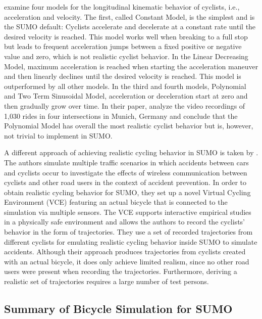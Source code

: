 \textcite{twaddle2016modeling} examine four models for the longitudinal kinematic behavior of cyclists, i.e., acceleration and velocity.
The first, called Constant Model, is the simplest and is the SUMO default:
Cyclists accelerate and decelerate at a constant rate until the desired velocity is reached.
This model works well when breaking to a full stop but leads to frequent acceleration jumps between a fixed positive or negative value and zero, which is not realistic cyclist behavior.
In the Linear Decreasing Model, maximum acceleration is reached when starting the acceleration maneuver and then linearly declines until the desired velocity is reached.
This model is outperformed by all other models.
In the third and fourth models, Polynomial and Two Term Sinusoidal Model, acceleration or deceleration start at zero and then gradually grow over time.
In their paper, \textcite{twaddle2016modeling} analyze the video recordings of 1,030 rides in four intersections in Munich, Germany and conclude that the Polynomial Model has overall the most realistic cyclist behavior but is, however, not trivial to implement in SUMO.

A different approach of achieving realistic cycling behavior in SUMO is taken by \textcite{heinovski2019modeling}.
The authors simulate multiple traffic scenarios in which accidents between cars and cyclists occur to investigate the effects of wireless communication between cyclists and other road users in the context of accident prevention.
In order to obtain realistic cycling behavior for SUMO, they set up a novel Virtual Cycling Environment (VCE) featuring an actual bicycle that is connected to the simulation via multiple sensors.
The VCE supports interactive empirical studies in a physically safe environment and allows the authors to record the cyclists' behavior in the form of trajectories.
They use a set of recorded trajectories from different cyclists for emulating realistic cycling behavior inside SUMO to simulate accidents.
Although their approach produces trajectories from cyclists created with an actual bicycle, it does only achieve limited realism, since no other road users were present when recording the trajectories.
Furthermore, deriving a realistic set of trajectories requires a large number of test persons.


\subsection{Summary of Bicycle Simulation for SUMO}
\label{subsec:summary_sumo}


